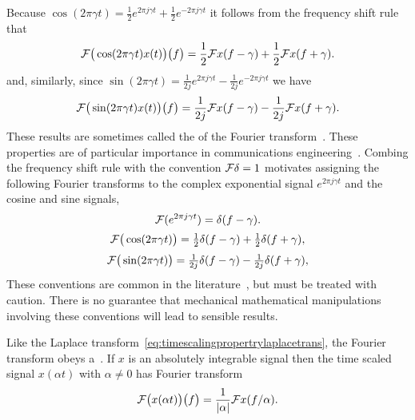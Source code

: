 
Because $\cos( 2\pi \gamma t) = \tfrac{1}{2}e^{2\pi j \gamma t} + \tfrac{1}{2}e^{-2\pi j \gamma t}$ it follows from the frequency shift rule that
\begin{equation}\label{eq:modulationpropertyft}
{\mathcal F}\big( \cos(2\pi \gamma t) x(t)\big)\big( f \big) =  \frac{1}{2}{\mathcal F} x(f - \gamma) + \frac{1}{2}{\mathcal F} x(f + \gamma).
\end{equation}
and, similarly, since $\sin( 2\pi \gamma t) = \tfrac{1}{2j}e^{2\pi j \gamma t} - \tfrac{1}{2j}e^{-2\pi j \gamma t}$ we have
\[
 {\mathcal F}\big( \sin(2\pi \gamma t) x(t)\big)\big( f \big) =  \frac{1}{2j}{\mathcal F} x(f - \gamma) - \frac{1}{2j}{\mathcal F} x( f + \gamma).
 \]
These results are sometimes called the  of the Fourier transform~\cite[page~61]{Papoulis_signal_analysis_1977}.  These properties are of particular importance in communications engineering~\citep{Proakis_digital_comms}.  Combing the frequency shift rule with the convention ${\mathcal F} \delta = 1$ motivates assigning the following Fourier transforms to the complex exponential signal $e^{2\pi j \gamma t}$ and the cosine and sine signals,
\[
 {\mathcal F}(e^{2\pi j  \gamma t}) = \delta(f - \gamma).
 \]
\[
{\mathcal F}\big( \cos(2\pi \gamma t) \big) = \tfrac{1}{2} \delta(f - \gamma) + \tfrac{1}{2} \delta(f + \gamma),
\]
\[
{\mathcal F}\big( \sin(2\pi \gamma t) \big) = \tfrac{1}{2j} \delta(f - \gamma) - \tfrac{1}{2j} \delta(f + \gamma),
\]
These conventions are common in the literature~\citep{Oppenheiim_sigs_sys_1996,Proakis_digital_comms}, but must be treated with caution.  There is no guarantee that mechanical mathematical manipulations involving these conventions will lead to sensible results.

Like the Laplace transform~\eqref{eq:timescalingpropertrylaplacetrans}, the Fourier transform obeys a~.  If $x$ is an absolutely integrable signal then the time scaled signal $x(\alpha t)$ with $\alpha \neq 0$ has Fourier transform
\begin{equation}\label{eq:timescalingpropertryfouriertrans}
{\mathcal F}\big( x(\alpha t)\big)\big( f \big) = \frac{1}{\left\vert \alpha \right\vert} {\mathcal F} x (f/\alpha).
\end{equation}



